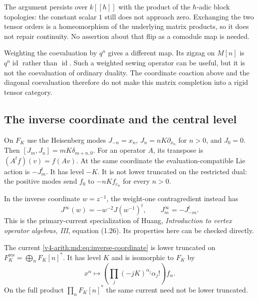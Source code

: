 The argument persists over $k[[\hbar]]$ with the product of
the $\hbar$-adic block topologies: the constant scalar $1$
still does not approach zero. Exchanging the two tensor
orders is a homeomorphism of the underlying matrix products,
so it does not repair continuity. No assertion about that
flip as a comodule map is needed.

Weighting the coevaluation by $q^n$ gives a different map.
Its zigzag on $M[n]$ is $q^n\operatorname{id}$ rather than
$\operatorname{id}$. Such a weighted sewing operator can
be useful, but it is not the coevaluation of ordinary
duality. The coordinate coaction above and the diagonal
coevaluation therefore do not make this matrix completion
into a rigid tensor category.

\subsection{The inverse coordinate and the central level}

On $F_K$ use the Heisenberg modes
$J_{-n}=x_n$, $J_n=nK\partial_{x_n}$ for $n>0$, and
$J_0=0$. Then $[J_m,J_n]=mK\delta_{m+n,0}$.
For an operator $A$, its transpose is
$(A^tf)(v)=f(Av)$.
At the same coordinate the evaluation-compatible Lie
action is $-J_m^t$. It has level $-K$. It is not lower
truncated on the restricted dual: the positive modes
send $f_0$ to $-nKf_{e_n}$ for every $n>0$.

In the inverse coordinate $w=z^{-1}$, the weight-one
contragredient instead has
\begin{equation}\label{v4-arith:md:eq:inverse-coordinate}
 J^\infty(w)=-w^{-2}J(w^{-1})^t,
 \qquad J^\infty_m=-J_{-m}^t.
\end{equation}
This is the primary-current specialization of Huang,
\emph{Introduction to vertex operator algebras, III},
equation (1.26). Its properties here can be checked directly.

\begin{proposition}
\label{v4-arith:md:prop:contragredient}
The current \eqref{v4-arith:md:eq:inverse-coordinate} is
lower truncated on $F_K^{\mathrm{res}}=\bigoplus_nF_K[n]^*$.
It has level $K$ and is isomorphic to $F_K$ by
\begin{equation}\label{v4-arith:md:eq:fock-identification}
 x^\alpha\longmapsto
 \left(\prod_j(-jK)^{\alpha_j}\alpha_j!\right)f_\alpha.
\end{equation}
On the full product $\prod_nF_K[n]^*$ the same current
need not be lower truncated.
\end{proposition}

